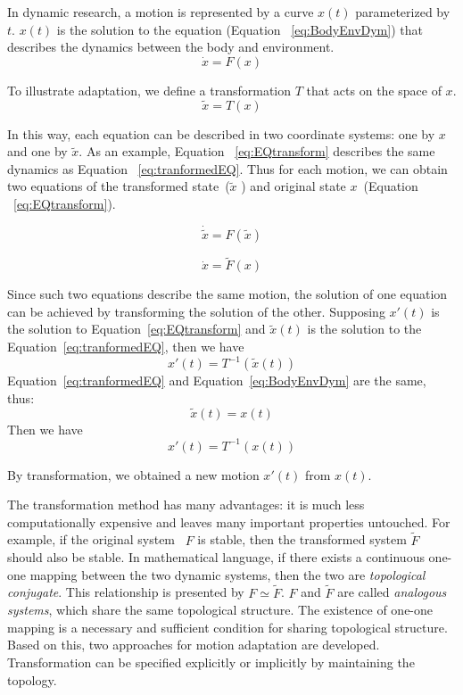 In dynamic \cms research, a motion is represented by  a curve  $x(t)$ parameterized by $t$.
$x(t)$ is the solution to the equation (Equation ~\ref{eq:BodyEnvDym}) that describes the dynamics between the body and environment.
\begin{equation}
\dot{x}=F(x)
\label{eq:BodyEnvDym}
\end{equation}


To illustrate adaptation, we define a transformation $T$ that acts on the space of $x$.
\[
\tilde{x}=T(x)
\]

In this way, each equation can be described in two coordinate systems: one by $x$ and one by $\tilde{x}$.
As an example, Equation ~\ref{eq:EQtransform} describes the same dynamics as  Equation ~\ref{eq:tranformedEQ}.
Thus for each motion, we can obtain two equations of the transformed state~($\tilde{x}$ ) and original state $x$~(Equation ~\ref{eq:EQtransform}).

\begin{equation}
\dot{\tilde{x}}=F(\tilde{x})
\label{eq:tranformedEQ}
\end{equation}

\begin{equation}
\dot{x}=\tilde{F}(x)
\label{eq:EQtransform}
\end{equation}

Since such two equations describe the same motion, the solution of one equation can be achieved by transforming the solution of the other.
Supposing $x'(t)$ is the solution to Equation~\ref{eq:EQtransform} and $\tilde{x}(t)$ is the solution to the Equation~\ref{eq:tranformedEQ}, then we have
\[
x'(t)=T^{-1}(\tilde{x}(t))
\]
Equation~\ref{eq:tranformedEQ} and Equation~\ref{eq:BodyEnvDym} are the same, thus: 
\[
\tilde{x}(t)=x(t)
\]
Then we have
\[
x'(t)=T^{-1}(x(t))
\]

By transformation, we obtained a new motion $x'(t)$ from $x(t)$.





%
%
The  transformation method has many advantages: it is much less computationally expensive and leaves many important properties untouched.
For example, if the original system ~$F$ is stable, then the transformed system $\tilde{F}$ should also be stable. 
%
In mathematical language, if there exists a continuous one-one mapping between the two dynamic systems, then the two are \emph{topological conjugate}.
This relationship is presented by $F \simeq \tilde{F}$.
$F$ and $\tilde{F}$ are called \emph{analogous systems}, which share the same topological structure.
The existence of one-one mapping is a necessary and sufficient condition for sharing topological structure.
Based on this, two  approaches for motion adaptation are developed.
Transformation can be specified explicitly or implicitly by maintaining the topology.



